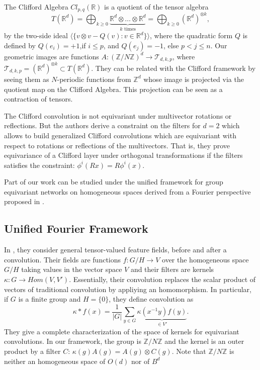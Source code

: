 \documentclass{article}
\theoremstyle{definition}
\begin{document}
The Clifford Algebra $Cl_{p,q}(\mathbb{R})$  is a quotient of the tensor algebra \begin{equation}
    T(\mathbb{R}^d)= \bigoplus_{k\geq 0} \underbrace{\mathbb{R}^d\otimes \ldots \otimes {\mathbb{R}^d}}_{k \text{ times}}= \bigoplus_{k\geq 0} (\mathbb{R}^d)^{\otimes k},
\end{equation} 
by the two-side ideal $\langle\{v\otimes v - Q(v): v \in \mathbb{R}^d\}\rangle$, where the quadratic form $Q$ is defined by $Q(e_i)=+1$,if  $i\leq p$, and $Q(e_j)=-1$, else $p<j\leq n$.
Our geometric images are functions $A:(\mathbb{Z}/N\mathbb{Z})^d \to \mathcal T_{d,k,p}$, where $\mathcal{T}_{d,k,p}= (\mathbb{R}^d)^{\otimes k}\subset T(\mathbb{R}^d)$. They can be related with the Clifford framework by seeing them as $N$-periodic functions from $\mathbb{Z}^d$ whose image is projected via the quotient map on the Clifford Algebra. This projection can be seen as a contraction of tensors. 

The Clifford convolution is not equivariant under multivector rotations or reflections. But the authors derive a constraint on the filters for $d=2$ which allows to build generalized Clifford convolutions which are equivariant with respect to rotations or reflections of the multivectors. That is, they prove equivariance of a Clifford layer under orthogonal transformations if the filters satisfies the constraint: $\phi^i (Rx) = R\phi^i(x)$.

Part of our work can be studied under the unified framework for group equivariant networks on homogeneous spaces derived from a Fourier perspective proposed in \cite{ref2}. 
\subsection{Unified Fourier Framework}
In \cite{ref2}, they consider general tensor-valued feature fields, before and after a convolution.  Their fields are functions $f : G/H \to V$ over the homogeneous space $G/H$ taking values in the vector space $V$ and their filters are kernels $\kappa: G \to Hom (V,V')$. Essentially, their convolution replaces the scalar product of vectors of traditional convolution by appliying an homomorphism. In particular, if $G$ is a finite group and $H=\{0\}$, they define convolution as
\begin{equation}
    \kappa* f(x)= \frac{1}{|G|}\sum_{y\in G}\underbrace{\kappa(x^{-1}y)f(y)}_{\in V'}.  
\end{equation}
They give a complete characterization of the space of kernels for equivariant convolutions. In our framework, the group is $\mathbb{Z}/N\mathbb{Z}$ and the kernel is an outer product by a filter $C$: $\kappa(g)A(g)=A(g)\otimes C(g)$. Note that $\mathbb{Z}/N\mathbb{Z}$ is neither an homogeneous space of $O(d)$ nor of $B^d$
\end{document}
